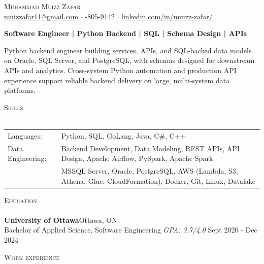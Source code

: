 \documentclass[a4paper]{article}
\newcommand{\lineunder} {
    \vspace*{-8pt} \\
    \hspace*{-18pt} \hrulefill \\
}
\newcommand{\header} [1] {
    {\hspace*{-18pt}\vspace*{6pt} \textsc{#1}}
    \vspace*{-6pt} \lineunder
}
\begin{document}
\vspace*{-40pt}

\vspace*{-10pt}
\begin{center}
	{\Huge \scshape {Muhammad Muizz Zafar}}\\
	\faSend \space \href{mailto:muizzafar11@gmail.com}{muizzafar11@gmail.com} $\cdot$ \faPhoneSquare {}-805-9142 $\cdot$ \faLinkedinSquare \space \href{https://www.linkedin.com/in/muizz-zafar/}{linkedin.com/in/muizz-zafar/}
	\\
\end{center}

\vspace{-5pt}
\begin{center}
\textbf{Software Engineer | Python Backend | SQL | Schema Design | APIs}
\end{center}
\begin{center}
Python backend engineer building services, APIs, and SQL-backed data models on Oracle, SQL Server, and PostgreSQL, with schemas designed for downstream APIs and analytics. Cross-system Python automation and production API experience support reliable backend delivery on large, multi-system data platforms.
\end{center}

\header{Skills}
\begin{tabular}{ l l }
	Languages: 
& Python, SQL, GoLang, Java, C\#, C++ \\

Data Engineering: 
& Backend Development, Data Modeling, REST APIs, API Design, Apache Airflow, PySpark, Apache Spark\\
& MSSQL Server, Oracle, PostgreSQL, AWS (Lambda, S3, Athena, Glue, CloudFormation), Docker, Git, Linux, Datalake

\end{tabular}

\header{Education}
\textbf{University of Ottawa}\hfill Ottawa, ON\\
Bachelor of Applied Science, Software Engineering \textit{GPA: 3.7/4.0} \hfill Sept 2020 - Dec 2024\\
\vspace{2mm}

\header{Work experience}
\vspace{1.5mm}
\end{document}
